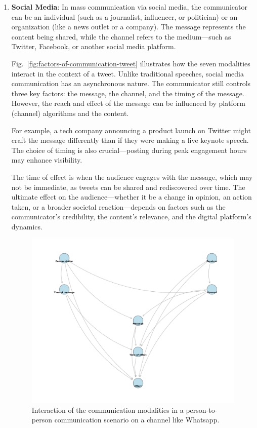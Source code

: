 \begin{enumerate}
    \item \textbf{Social Media}: In mass communication via social media, the communicator can be an individual (such as a journalist, influencer, or politician) or an organization (like a news outlet or a company). The message represents the content being shared, while the channel refers to the medium—such as Twitter, Facebook, or another social media platform.
    
    Fig.~\ref{fig:factors-of-communication-tweet} illustrates how the seven modalities interact in the context of a tweet. Unlike traditional speeches, social media communication has an asynchronous nature. The communicator still controls three key factors: the message, the channel, and the timing of the message. However, the reach and effect of the message can be influenced by platform (channel) algorithms and the content.
    
    For example, a tech company announcing a product launch on Twitter might craft the message differently than if they were making a live keynote speech. The choice of timing is also crucial—posting during peak engagement hours may enhance visibility.
    
    The time of effect is when the audience engages with the message, which may not be immediate, as tweets can be shared and rediscovered over time. The ultimate effect on the audience—whether it be a change in opinion, an action taken, or a broader societal reaction—depends on factors such as the communicator's credibility, the content's relevance, and the digital platform's dynamics.


\begin{figure}[!t]
    \centering
    \includegraphics[width=1.0\textwidth]{images/pgm_mass_communication_p2p.png}
    \caption{Interaction of the communication modalities in a person-to-person communication scenario on a channel like Whatsapp. 
    \label{fig:factors-of-communication-p2p}}
  \end{figure}



\end{enumerate}
